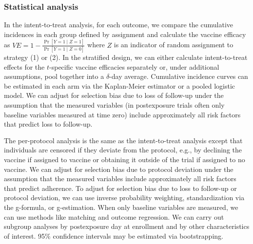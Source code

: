 \documentclass[11pt]{article}
\begin{document}
\subsubsection*{Statistical analysis}
In the intent-to-treat analysis, for each outcome, we compare the cumulative incidences in each group defined by assignment and calculate the vaccine efficacy as $VE = 1 - \frac{\Pr[Y = 1 \mid Z = 1]}{\Pr[Y = 1 \mid Z = 0]}$ where $Z$ is an indicator of random assignment to strategy (1) or (2). In the stratified design, we can either calculate intent-to-treat effects for the $t$-specific vaccine efficacies separately or, under additional assumptions, pool together into a $\delta$-day average. Cumulative incidence curves can be estimated  in each arm via the Kaplan-Meier estimator or a pooled logistic model. We can adjust for selection bias due to loss of follow-up under the assumption that the measured variables (in postexposure trials often only baseline variables measured at time zero) include approximately all risk factors that predict loss to follow-up.

The per-protocol analysis is the same as the intent-to-treat analysis except that individuals are censored if they deviate from the protocol, e.g., by declining the vaccine if assigned to vaccine or obtaining it outside of the trial if assigned to no vaccine. We can adjust for selection bias due to protocol deviation under the assumption that the measured variables include approximately all risk factors that predict adherence. To adjust for selection bias due to loss to follow-up or protocol deviation, we can use inverse probability weighting, standardization via the g-formula, or g-estimation. When only baseline variables are measured, we can use methods like matching and outcome regression. We can carry out subgroup analyses by postexposure day at enrollment and by other characteristics of interest. 95\% confidence intervals may be estimated via bootstrapping.
\end{document}
